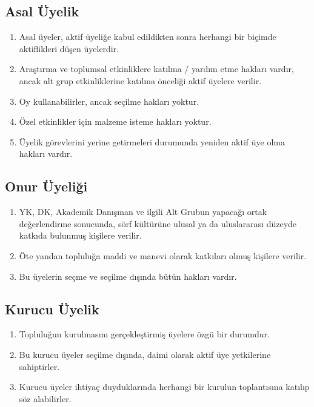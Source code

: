 \documentclass[11pt,a4paper]{article}
\begin{document}
\subsection{Asal Üyelik}
\begin{enumerate}
    \item Asal üyeler, aktif üyeliğe kabul edildikten sonra herhangi bir biçimde aktiflikleri düşen üyelerdir.
    \item Araştırma ve toplumsal etkinliklere katılma / yardım etme hakları vardır, ancak alt grup etkinliklerine katılma önceliği aktif üyelere verilir.
    \item Oy kullanabilirler, ancak seçilme hakları yoktur.
    \item Özel etkinlikler için malzeme isteme hakları yoktur.
    \item Üyelik görevlerini yerine getirmeleri durumunda yeniden aktif üye olma hakları vardır.
\end{enumerate}

\subsection{Onur Üyeliği}
\begin{enumerate}
    \item YK, DK, Akademik Danışman ve ilgili Alt Grubun yapacağı ortak değerlendirme sonucunda, sörf kültürüne ulusal ya da uluslararası düzeyde katkıda bulunmuş kişilere verilir.
    \item Öte yandan topluluğa maddi ve manevi olarak katkıları olmuş kişilere verilir.
    \item Bu üyelerin seçme ve seçilme dışında bütün hakları vardır.
\end{enumerate}

\subsection{Kurucu Üyelik}
\begin{enumerate}
    \item Topluluğun kurulmasını gerçekleştirmiş üyelere özgü bir durumdur.
    \item Bu kurucu üyeler seçilme dışında, daimi olarak aktif üye yetkilerine sahiptirler.
    \item Kurucu üyeler ihtiyaç duyduklarında herhangi bir kurulun toplantısına katılıp söz alabilirler.
\end{enumerate}
\end{document}

